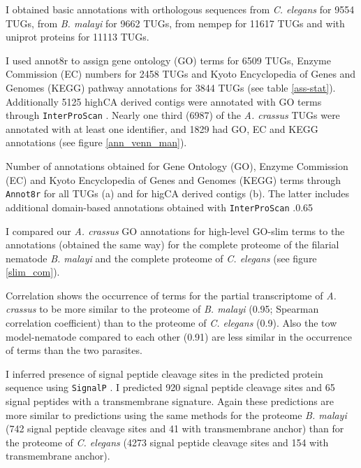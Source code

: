 I obtained basic annotations with orthologous sequences from
\textit{C. elegans} for 9554 TUGs, from \textit{B. malayi} for 9662
TUGs, from nempep \cite{parkinson_nembase:resource_2004, pmid21550347}
for 11617 TUGs and with uniprot proteins for 11113 TUGs.

I used annot8r \cite{schmid_annot8r:_2008} to assign gene ontology
(GO) terms for 6509 TUGs, Enzyme Commission (EC) numbers for 2458 TUGs
and Kyoto Encyclopedia of Genes and Genomes (KEGG) pathway annotations
for 3844 TUGs (see table \ref{ass-stat}). Additionally 5125 highCA
derived contigs were annotated with GO terms through
\texttt{InterProScan} \cite{pmid11590104}. Nearly one third (6987) of
the \textit{A. crassus} TUGs were annotated with at least one
identifier, and 1829 had GO, EC and KEGG annotations (see figure
\ref{ann_venn_man}).

 {Number
  of annotations obtained for Gene Ontology (GO), Enzyme Commission
  (EC) and Kyoto Encyclopedia of Genes and Genomes (KEGG) terms
  through \texttt{Annot8r} \cite{schmid_annot8r:_2008} for all TUGs
  (a) and for higCA derived contigs (b). The latter includes
  additional domain-based annotations obtained with
  \texttt{InterProScan} \cite{pmid11590104}.}{0.65}

I compared our \textit{A. crassus} GO annotations for high-level
GO-slim terms to the annotations (obtained the same way) for the
complete proteome of the filarial nematode \textit{B. malayi} and the
complete proteome of \textit{C. elegans} (see figure \ref{slim_com}).

Correlation shows the occurrence of terms for the partial
transcriptome of \textit{A. crassus} to be more similar to the
proteome of \textit{B. malayi} (0.95; Spearman correlation
coefficient) than to the proteome of \textit{C. elegans} (0.9). Also
the tow model-nematode compared to each other (0.91) are less similar
in the occurrence of terms than the two parasites.


I inferred presence of signal peptide cleavage sites in the predicted
protein sequence using \texttt{SignalP} \cite{pmid21959131}. I
predicted 920 signal peptide cleavage sites and 65 signal peptides
with a transmembrane signature. Again these predictions are more
similar to predictions using the same methods for the proteome
\textit{B. malayi} (742 signal peptide cleavage sites and 41 with
transmembrane anchor) than for the proteome of \textit{C. elegans}
(4273 signal peptide cleavage sites and 154 with transmembrane
anchor).

